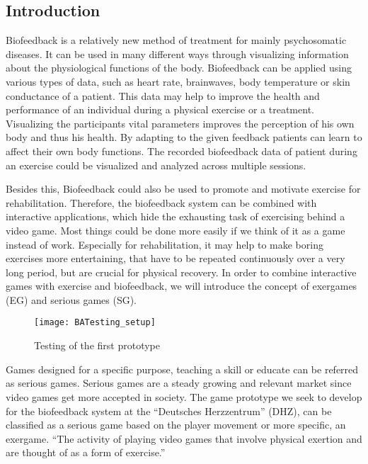 \begin{multicols}{2}

\section{Introduction}
Biofeedback is a relatively new method of treatment for mainly psychosomatic diseases. It can be used in many different ways through visualizing information about the physiological functions of the body. Biofeedback can be applied using various types of data, such as heart rate, brainwaves, body temperature or skin conductance of a patient. This data may help to improve the health and performance of an individual during a physical exercise or a treatment. Visualizing the participants vital parameters improves the perception of his own body and thus his health. 
By adapting to the given feedback patients can learn to affect their own body functions.\cite{BF2007} The recorded biofeedback data of patient during an exercise could be visualized and analyzed across multiple sessions. 

Besides this, Biofeedback could also be used to promote and motivate exercise for rehabilitation. Therefore, the biofeedback system can be combined with interactive applications, which hide the exhausting task of exercising behind a video game. Most things could be done more easily if we think of it as a game instead of work. Especially for rehabilitation, it may help to make boring exercises more entertaining, that have to be repeated continuously over a very long period, but are crucial for physical recovery. In order to combine interactive games with
exercise and biofeedback, we will introduce the concept of exergames (EG) and serious games (SG).
\begin{figure}[H]
  \centering
    \texttt{[image: BATesting\_setup]}
 \caption{Testing of the first prototype}
\end{figure}
Games designed for a specific purpose, teaching a skill or educate can be referred as serious games. \cite{Derryberry} Serious games are a steady growing and relevant market since video games get more accepted in society. \cite{SGIndustry} The game prototype we seek to develop for the biofeedback system at the “Deutsches Herzzentrum” (DHZ), can be classified as a serious game based on the player movement or more specific, an exergame. “The activity of playing video games that involve physical exertion and are thought of as a form of exercise.” \cite{ExergameDef}


\end{multicols}
